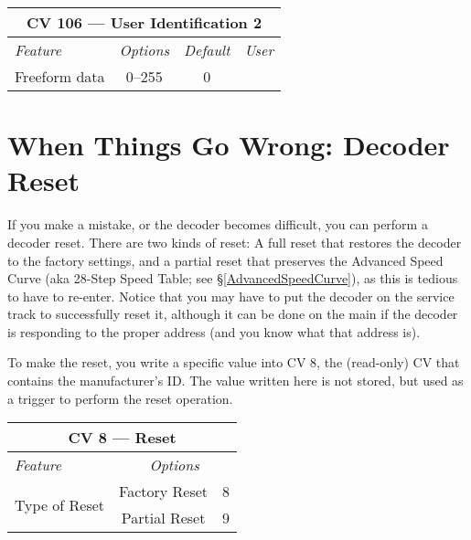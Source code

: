 \documentclass[12pt,letterpaper,draft]{memoir} %
\begin{document}
\label{CV106}
\begin{center}
\begin{tabular}{|l|c|c|c|}
\hline
\multicolumn{4}{|c|}{\textbf{CV 106 --- User Identification 2}} \\ \hline \hline
\textit{Feature} & \textit{Options} & \textit{Default} & \textit{User} \\ \hline
Freeform data & 0--255 & 0 &\\ \hline
\end{tabular}
\end{center}

\section{When Things Go Wrong: Decoder Reset}
\label{DecoderReset}
If you make a mistake, or the decoder becomes difficult, you can perform a decoder reset. There are two kinds of reset: A full reset that restores the decoder to the factory settings, and a partial reset that preserves the Advanced Speed Curve (aka 28-Step Speed Table; see \S\ref{AdvancedSpeedCurve}), as this is tedious to have to re-enter. Notice that you may have to put the decoder on the service track to successfully reset it, although it can be done on the main if the decoder is responding to the proper address (and you know what that address is).

To make the reset, you write a specific value into CV 8, the (read-only) CV that contains the manufacturer's ID. The value written here is not stored, but used as a trigger to perform the reset operation.

\begin{center}
\begin{tabular}{|l|cc|}
\hline
\multicolumn{3}{|c|}{\textbf{CV 8 --- Reset}} \\ \hline \hline
\textit{Feature}& \multicolumn{2}{c|}{\textit{Options}}  \\ \hline
\multirow{2}{*}{Type of Reset}  & Factory Reset & 8\\ 
& Partial Reset & 9 \\ \hline
\end{tabular}
\end{center}

\end{document}
